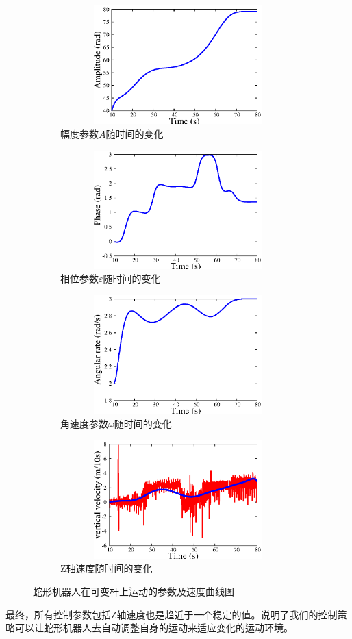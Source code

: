 \begin{figure}[htbp]
	\centering
	\begin{subfigure}{0.45\textwidth}{
			\centering
			\includegraphics[width=1\textwidth,height=130pt]{figure/chap05/BSB/a.eps}
			\caption{幅度参数$A$随时间的变化}
			\label{fig:bsa}
		}
	\end{subfigure}
	\begin{subfigure}{0.45\textwidth}{
			\centering
			\includegraphics[width=1\textwidth,height=130pt]{figure/chap05/BSB/p.eps}
			\caption{相位参数$\varepsilon$随时间的变化}
			\label{fig:bsp}
		}
	\end{subfigure}
	\begin{subfigure}{0.45\textwidth}{
			\centering
			\includegraphics[width=1\textwidth,height=130pt]{figure/chap05/BSB/w.eps}
			\caption{角速度参数$\omega$随时间的变化}
			\label{fig:bsw}
		}
	\end{subfigure}
	\begin{subfigure}{0.45\textwidth}{
			\centering
			\includegraphics[width=1\textwidth,height=130pt]{figure/chap05/BSB/v}
			\caption{Z轴速度随时间的变化}
			\label{fig:bsv}
		}
	\end{subfigure}
	\caption{蛇形机器人在可变杆上运动的参数及速度曲线图}
	\label{fig:BSB2}
\end{figure}
最终，所有控制参数包括Z轴速度也是趋近于一个稳定的值。说明了我们的控制策略可以让蛇形机器人去自动调整自身的运动来适应变化的运动环境。

